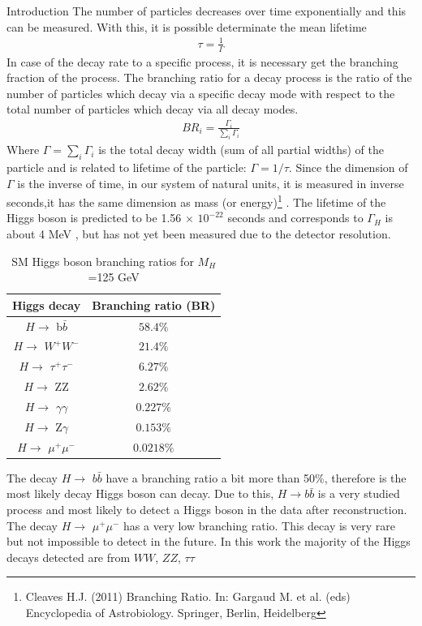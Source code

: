 \begin{chapter}{Introduction}
The number of particles decreases over time exponentially and this can be measured. With this, it is possible determinate the mean lifetime\cite{griff}
\begin{align}
\tau=\frac{1}{\Gamma}
\end{align}
In case of  the decay rate to a specific process, it is necessary get the branching fraction of the process. 
The branching ratio for a decay process is the ratio of the number of particles which decay via a specific decay mode with respect to the total number of particles which decay via all decay modes.
\begin{align}
BR_i =\frac{\Gamma_i}{\sum_{i}\Gamma_i}
\end{align}
Where $\Gamma=\sum_i\Gamma_i$ is the total decay width (sum of all partial widths) of the particle and is related to lifetime of the particle: $\Gamma=1/\tau$.
Since the dimension of $\Gamma$ is the inverse of time, in our system of natural units, it is measured in inverse seconds,it has the same dimension as mass (or energy)\footnote{Cleaves H.J. (2011) Branching Ratio. In: Gargaud M. et al. (eds) Encyclopedia of Astrobiology. Springer, Berlin, Heidelberg} . The lifetime of the Higgs boson is predicted to be 1.56 $\times$ $10^{-22}$ seconds and corresponds to $\Gamma_H$ is about 4 MeV , but has not yet been measured due to the detector resolution\cite{cms-manual}.
\\
\begin{table}[!htbp] 
\caption[SM Higgs boson branching ratios for  $M_H$ =125 GeV]{SM Higgs boson branching ratios for  $M_H$ =125 GeV \protect \cite{pd}}
\centering
\begin{tabular}{|c|c|}
\hline
Higgs decay & Branching ratio (BR)\\
\hline
$H \rightarrow$ b$\bar{b}$ &$58.4\%$ \\
\hline
 $H \rightarrow$ $W^+W^-$ &$21.4\%$ \\
\hline
$H \rightarrow$ $\tau^+ \tau^-$ & $6.27\%$\\
\hline
$H \rightarrow$ ZZ &$2.62\%$\\
\hline
$H \rightarrow$ $\gamma\gamma$ &$0.227\%$\\
\hline
$H \rightarrow$ Z$\gamma$ &$0.153\%$\\
\hline
$H \rightarrow$ $\mu^+\mu^-$ &$0.0218\%$\\
\hline
\end{tabular}
\label{higgs1}
\end{table}
The decay  $H \rightarrow$ $b\bar{b}$ have a branching ratio a bit more than 50$\%$, therefore is the most likely decay Higgs boson can decay. Due to this,  $H\rightarrow b\bar{b}$ is a very studied process and most likely to detect a Higgs boson in the data after reconstruction. The decay  $H \rightarrow$ $\mu^+\mu^-$ has a very low branching ratio. This decay is very rare but not impossible to detect in the future. In this work the majority of the Higgs decays detected are from $WW$, $ZZ$, $\tau \tau$\\


\end{chapter}

